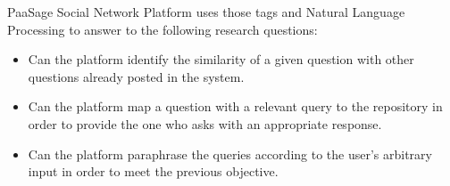 PaaSage Social Network Platform uses those tags and Natural Language Processing to answer to the following research questions:
\begin{itemize}
\item Can the platform identify the similarity of a given question with other questions already posted in the system.
\item Can the platform map a question with a relevant query to the repository in order to provide the one who asks with an appropriate response.
\item Can the platform paraphrase the queries according to the user's arbitrary input in order to meet the previous objective. 
\end{itemize}
